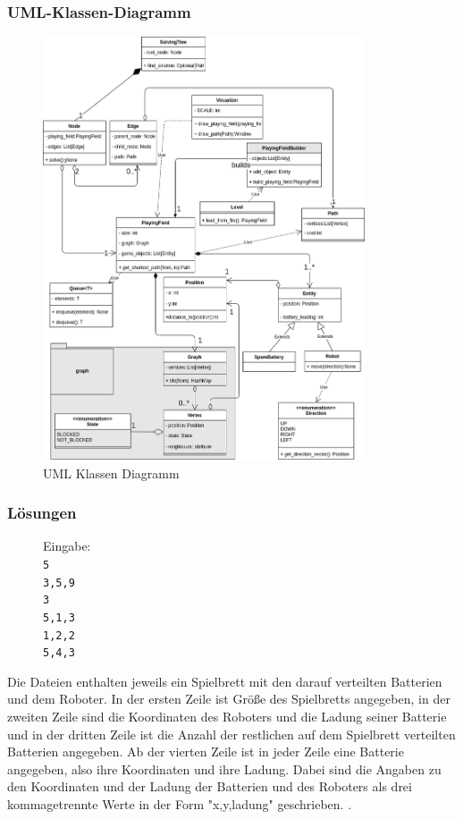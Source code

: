 \documentclass[a4paper,12pt,arial]{scrartcl}
\begin{document}
\newpage
\subsubsection{UML-Klassen-Diagramm}
\begin{figure}[h]
    \centering
    \includegraphics[width=0.85\textwidth]{uml_diagramm_v5.png}
    \caption{UML Klassen Diagramm}
    \label{fig:uml}
\end{figure}
\newpage

\newpage
\subsubsection{Lösungen}
\begin{figure}
Eingabe:
\texttt{ \\
5 \\
3,5,9 \\
3 \\
5,1,3 \\
1,2,2 \\
5,4,3 \\
}
\end{figure}
\normalsize
Die Dateien enthalten jeweils ein Spielbrett mit den darauf verteilten Batterien und dem Roboter.
In der ersten Zeile ist Größe des Spielbretts angegeben, in der zweiten Zeile sind die Koordinaten des Roboters und die Ladung seiner Batterie und in der dritten Zeile ist die Anzahl der restlichen auf dem Spielbrett verteilten Batterien angegeben.
Ab der vierten Zeile ist in jeder Zeile eine Batterie angegeben, also ihre Koordinaten und ihre Ladung.
Dabei sind die Angaben zu den Koordinaten und der Ladung der Batterien und des Roboters als drei kommagetrennte Werte in der Form "x,y,ladung" geschrieben. \textcite{bwinfMaterial}.
\end{document}
